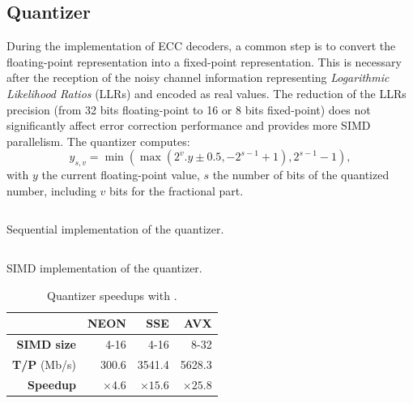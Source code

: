 \subsection{Quantizer}

During the implementation of ECC decoders, a common step is to convert the
floating-point representation into a fixed-point representation. This is
necessary after the reception of the noisy channel information representing
\textit{Logarithmic Likelihood Ratios} (LLRs) and encoded as real values. The
reduction of the LLRs precision (from 32 bits floating-point to 16 or 8 bits
fixed-point) does not significantly affect error correction performance and
provides more SIMD parallelism. The quantizer computes:
\begin{equation*}
y_{s,v} = \min(\max(2^v . y \pm 0.5, -2^{s-1} +1), 2^{s-1} -1),
\end{equation*}
with $y$ the current floating-point value, $s$ the number of bits of the
quantized number, including $v$ bits for the fractional part.

\begin{listing}[htp]
  \inputminted[frame=lines,linenos]{C++}{main/chapter3/src/quantizer/quantizer_seq.cpp}
  \caption{Sequential implementation of the quantizer.}
  \label{lst:vec_quantizer_seq}
\end{listing}

\begin{listing}[htp]
  \inputminted[frame=lines,linenos]{C++}{main/chapter3/src/quantizer/quantizer_simd.cpp}
  \caption{SIMD implementation of the quantizer.}
  \label{lst:vec_quantizer_simd}
\end{listing}

\begin{table}[htp]
  \centering
  \caption{Quantizer speedups with \MIPP.}
  \label{tab:vec_quantizer_speedup}
  \begin{tabular}{r | r  r r}
                      & \textbf{NEON} & \textbf{SSE}  & \textbf{AVX}  \\ \hline \hline
  \textbf{SIMD size}  & 4-16          & 4-16          & 8-32          \\ %
  \textbf{T/P} (Mb/s) & 300.6         & 3541.4        & 5628.3        \\ %
  \textbf{Speedup}    & $\times 4.6$  & $\times 15.6$ & $\times 25.8$ \\
  \end{tabular}
\end{table}


